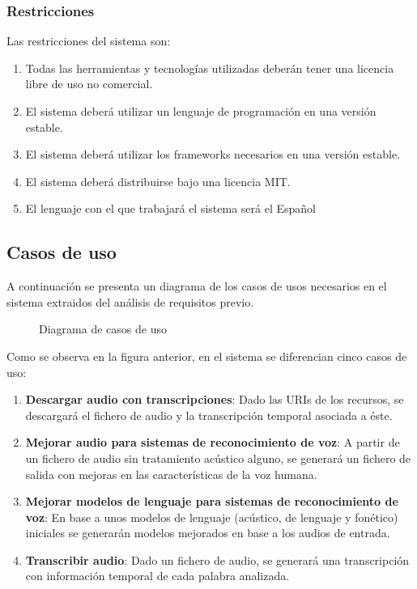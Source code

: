 \documentclass[../main.tex]{subfiles}
\begin{document}
\subsubsection{Restricciones}\label{subsubsec:restricciones}
Las restricciones del sistema son:
\begin{enumerate}
    \item Todas las herramientas y tecnologías utilizadas deberán tener una licencia libre de uso no comercial.
    \item El sistema deberá utilizar un lenguaje de programación en una versión estable.
    \item El sistema deberá utilizar los frameworks necesarios en una versión estable.
    \item El sistema deberá distribuirse bajo una licencia MIT.
    \item El lenguaje con el que trabajará el sistema será el Español
\end{enumerate}

\subsection{Casos de uso}\label{subsec:casos_uso}
A continuación se presenta un diagrama de los casos de usos necesarios en el sistema extraidos del análisis de requisitos previo.

\begin{figure}[H]
    \centering
    
    \label{fig:casos_uso}
    \caption{Diagrama de casos de uso}
\end{figure}

Como se observa en la figura anterior, en el sistema se diferencian cinco casos de uso:
\begin{enumerate}
    \item \textbf{Descargar audio con transcripciones}: Dado las URIs de los recursos, se descargará el fichero de audio y la transcripción temporal asociada a éste.
    \item \textbf{Mejorar audio para sistemas de reconocimiento de voz}: A partir de un fichero de audio sin tratamiento acústico alguno, 
    se generará un fichero de salida con mejoras en las características de la voz humana.
    \item \textbf{Mejorar modelos de lenguaje para sistemas de reconocimiento de voz}: En base a unos modelos de lenguaje (acústico, de lenguaje y fonético) iniciales se generarán modelos
    mejorados en base a los audios de entrada.
    \item \textbf{Transcribir audio}: Dado un fichero de audio, se generará una transcripción con información temporal de cada palabra analizada.
\end{enumerate}
\end{document}
